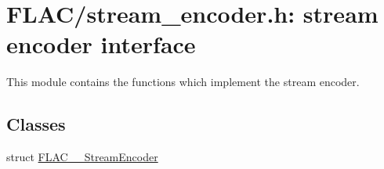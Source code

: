\hypertarget{group__flac__stream__encoder}{}\section{F\+L\+A\+C/stream\+\_\+encoder.h\+: stream encoder interface}
\label{group__flac__stream__encoder}


This module contains the functions which implement the stream encoder.  


\subsection*{Classes}
\begin{DoxyCompactItemize}
\item 
struct \hyperlink{struct_f_l_a_c_____stream_encoder}{F\+L\+A\+C\+\_\+\+\_\+\+Stream\+Encoder}
\end{DoxyCompactItemize}
